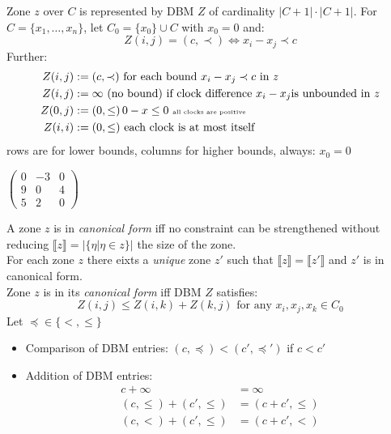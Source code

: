 \documentclass[a4paper, 10pt]{article}
\begin{document}
\begin{mdframed}[roundcorner=5pt,
subtitlebelowline=false,subtitleaboveline=false,
subtitlebackgroundcolor=blue!30,
frametitlerule=true,
frametitlebackgroundcolor=blue!30,
frametitle={Difference Bound Matrices}
]
Zone $z$ over $C$ is represented by DBM $Z$ of cardinality $|C+1|\cdot|C+1|$. For $C=\{x_1,\dots,x_n\}$, let $C_0=\{x_0\}\cup C$ with $x_0=0$ and:
\[ Z(i,j) = (c,\prec) \iff x_i-x_j\prec c \]
Further:
\begin{align*}
Z(i,j) &:= (c,\prec) \text{ for each bound } x_i-x_j\prec c \text{ in } z \\
Z(i,j) &:= \infty \text{ (no bound) if clock difference } x_i-x_j \text{is unbounded in } z \\
Z(0,j) &:= (0,\leq)\, 0-x\leq 0 \text{ \tiny all clocks are positive} \\
Z(i,i) &:= (0,\leq) \text{ each clock is at most itself}
\end{align*}
rows are for lower bounds, columns for higher bounds, always: $x_0=0$
\begin{center}
\hspace{-2em}
\raisebox{-.5\height}{\scalebox{.7}{}}
\follows $\begin{pmatrix}
0 & -3 & 0 \\ 9 & 0 & 4 \\ 5 & 2 & 0
\end{pmatrix}$
\end{center}
A zone $z$ is in \emph{canonical form} iff no constraint can be strengthened without reducing $\llbracket z\rrbracket = |\{\eta|\eta\in z\}|$ {\tiny the size of the zone}. \\
For each zone $z$ there eixts a \emph{unique} zone $z'$ such that $\llbracket z\rrbracket = \llbracket z'\rrbracket$ and $z'$ is in canonical form.\\
Zone $z$ is in its \emph{canonical form} iff DBM $Z$ satisfies:
\[ Z(i,j) \leq Z(i,k)+Z(k,j) \text{ for any } x_i,x_j,x_k\in C_0 \]
Let $\preceq\in\{<,\leq\}$
\begin{itemize}
    \item Comparison of DBM entries: $(c,\preceq)<(c',\preceq')$ if $c<c'$
    \item Addition of DBM entries:
    \begin{align*}
    c+\infty &= \infty \\
    (c,\leq) + (c',\leq) &= (c+c',\leq) \\
    (c,<) + (c',\leq) &= (c+c',<)
    \end{align*}
\end{itemize}


\end{mdframed}
\end{document}
